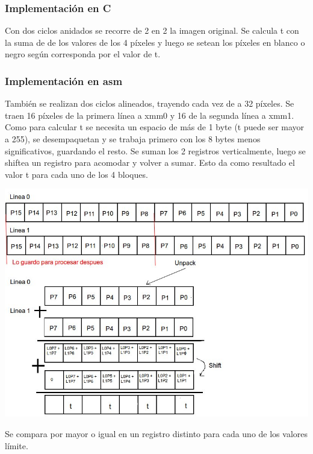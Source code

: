 \subsubsection{Implementaci\'on en C}
\indent Con dos ciclos anidados se recorre de 2 en 2 la imagen original.\newline
Se calcula t con la suma de de los valores de los 4 p\'ixeles y luego se setean los p\'ixeles en blanco o negro seg\'un corresponda por el valor de t.\newline
\subsubsection{Implementaci\'on en asm}
Tambi\'en se realizan dos ciclos alineados, trayendo cada vez de a 32 p\'ixeles. \newline
Se traen 16 p\'ixeles de la primera l\'inea a xmm0 y 16 de la segunda l\'inea a xmm1.\newline
Como para calcular t se necesita un espacio de m\'as de 1 byte (t puede ser mayor a 255), se desempaquetan y se trabaja primero con los 8 bytes menos significativos, guardando el resto.\newline
Se suman los 2 registros verticalmente, luego se shiftea un registro para acomodar y volver a sumar.
Esto da como resultado el valor t para cada uno de los 4 bloques.\newline
\begin{center}
	\includegraphics[scale=0.5]{halftone2.jpg}
\end{center}
\newline
Se compara por mayor o igual en un registro distinto para cada uno de los valores l\'imite.\newline
